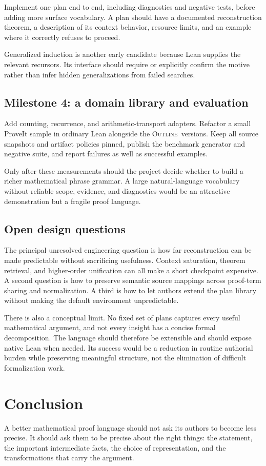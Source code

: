 \documentclass[11pt,a4paper]{article}
\newcommand{\Outline}{\textsc{Outline}}
\theoremstyle{definition}
\theoremstyle{remark}
\numberwithin{equation}{section}
\begin{document}
Implement one plan end to end, including diagnostics and negative tests, before adding more surface vocabulary. A plan should have a documented reconstruction theorem, a description of its context behavior, resource limits, and an example where it correctly refuses to proceed.

Generalized induction is another early candidate because Lean supplies the relevant recursors. Its interface should require or explicitly confirm the motive rather than infer hidden generalizations from failed searches.

\subsection{Milestone 4: a domain library and evaluation}
Add counting, recurrence, and arithmetic-transport adapters. Refactor a small ProveIt sample in ordinary Lean alongside the \Outline\ versions. Keep all source snapshots and artifact policies pinned, publish the benchmark generator and negative suite, and report failures as well as successful examples.

Only after these measurements should the project decide whether to build a richer mathematical phrase grammar. A large natural-language vocabulary without reliable scope, evidence, and diagnostics would be an attractive demonstration but a fragile proof language.

\subsection{Open design questions}
The principal unresolved engineering question is how far reconstruction can be made predictable without sacrificing usefulness. Context saturation, theorem retrieval, and higher-order unification can all make a short checkpoint expensive. A second question is how to preserve semantic source mappings across proof-term sharing and normalization. A third is how to let authors extend the plan library without making the default environment unpredictable.

There is also a conceptual limit. No fixed set of plans captures every useful mathematical argument, and not every insight has a concise formal decomposition. The language should therefore be extensible and should expose native Lean when needed. Its success would be a reduction in routine authorial burden while preserving meaningful structure, not the elimination of difficult formalization work.

\section{Conclusion}
A better mathematical proof language should not ask its authors to become less precise. It should ask them to be precise about the right things: the statement, the important intermediate facts, the choice of representation, and the transformations that carry the argument.
\end{document}
